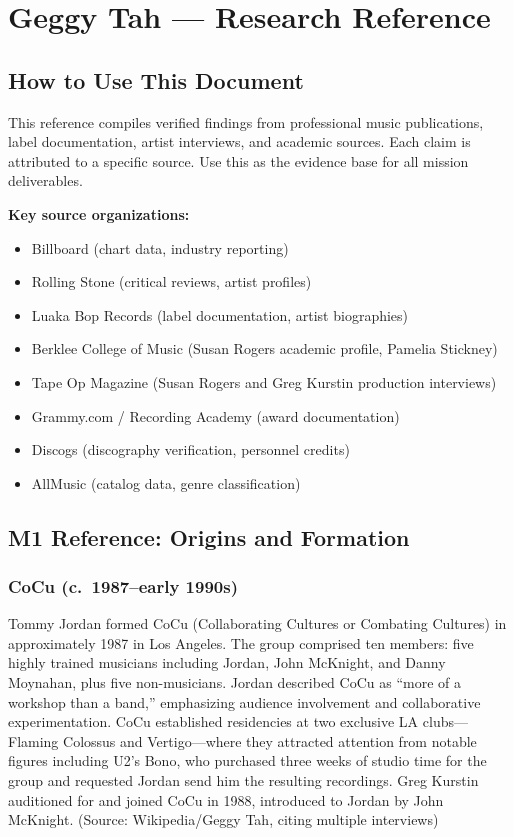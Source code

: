 \documentclass[11pt,letterpaper]{article}
\newcommand{\stageheader}[2]{%
  \noindent\colorbox{#2}{\makebox[\textwidth][l]{%
    \textcolor{white}{\bfseries\sffamily\hspace{6pt}#1\hspace{6pt}}}}%
  \vspace{0.5em}\par%
}
\begin{document}
\newpage
\stageheader{STAGE 2 --- RESEARCH REFERENCE}{secondary}

\section{Geggy Tah --- Research Reference}

\subsection{How to Use This Document}

This reference compiles verified findings from professional music publications, label documentation, artist interviews, and academic sources. Each claim is attributed to a specific source. Use this as the evidence base for all mission deliverables.

\textbf{Key source organizations:}
\begin{itemize}[leftmargin=2em]
\item Billboard (chart data, industry reporting)
\item Rolling Stone (critical reviews, artist profiles)
\item Luaka Bop Records (label documentation, artist biographies)
\item Berklee College of Music (Susan Rogers academic profile, Pamelia Stickney)
\item Tape Op Magazine (Susan Rogers and Greg Kurstin production interviews)
\item Grammy.com / Recording Academy (award documentation)
\item Discogs (discography verification, personnel credits)
\item AllMusic (catalog data, genre classification)
\end{itemize}

\subsection{M1 Reference: Origins and Formation}

\subsubsection{CoCu (c.\ 1987--early 1990s)}

Tommy Jordan formed CoCu (Collaborating Cultures or Combating Cultures) in approximately 1987 in Los Angeles. The group comprised ten members: five highly trained musicians including Jordan, John McKnight, and Danny Moynahan, plus five non-musicians. Jordan described CoCu as ``more of a workshop than a band,'' emphasizing audience involvement and collaborative experimentation. CoCu established residencies at two exclusive LA clubs---Flaming Colossus and Vertigo---where they attracted attention from notable figures including U2's Bono, who purchased three weeks of studio time for the group and requested Jordan send him the resulting recordings. Greg Kurstin auditioned for and joined CoCu in 1988, introduced to Jordan by John McKnight. (Source: Wikipedia/Geggy Tah, citing multiple interviews)
\end{document}
